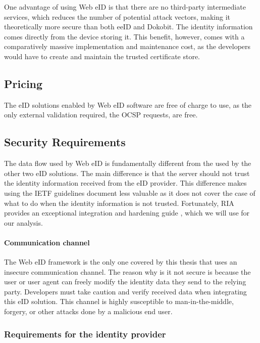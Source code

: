 One advantage of using Web eID is that there are no third-party intermediate services, which reduces the number of potential attack vectors, making it theoretically more secure than both eeID and Dokobit. The identity information comes directly from the device storing it. This benefit, however, comes with a comparatively massive implementation and maintenance cost, as the developers would have to create and maintain the trusted certificate store.

\subsection{Pricing}

The eID solutions enabled by Web eID software are free of charge to use, as the only external validation required, the OCSP \cite{rfc6960} requests, are free.

\subsection{Security Requirements}

The data flow used by Web eID is fundamentally different from the used by the other two eID solutions. The main difference is that the server should not trust the identity information received from the eID provider. This difference makes using the IETF guidelines document \cite{ietf-oauth-security-topics-19} less valuable as it does not cover the case of what to do when the identity information is not trusted. Fortunately, RIA provides an exceptional integration and hardening guide \cite{ria-webeid-systemarchitecture}, which we will use for our analysis.

\paragraph{Communication channel}

The Web eID framework is the only one covered by this thesis that uses an insecure communication channel. The reason why is it not secure is because the user or user agent can freely modify the identity data they send to the relying party. Developers must take caution and verify received data when integrating this eID solution. This channel is highly susceptible to man-in-the-middle, forgery, or other attacks done by a malicious end user.

\subsubsection{Requirements for the identity provider}

